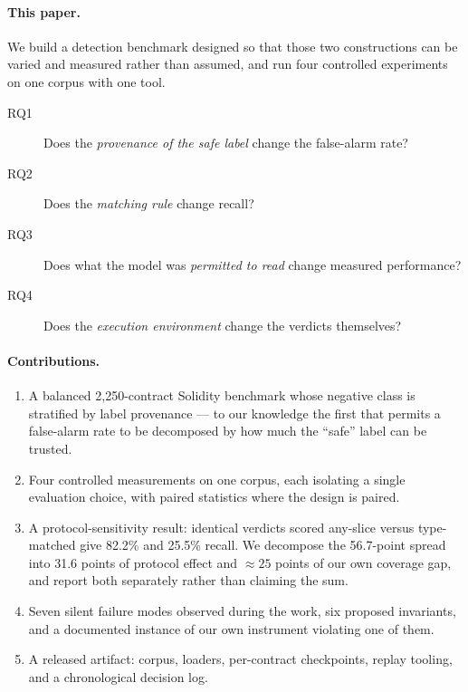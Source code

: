 \documentclass[sigconf,nonacm]{acmart}
\begin{document}
\paragraph{This paper.}
We build a detection benchmark designed so that those two constructions can be
varied and measured rather than assumed, and run four controlled experiments on
one corpus with one tool.

\begin{description}
\item[RQ1] Does the \emph{provenance of the safe label} change the false-alarm
  rate?
\item[RQ2] Does the \emph{matching rule} change recall?
\item[RQ3] Does what the model was \emph{permitted to read} change measured
  performance?
\item[RQ4] Does the \emph{execution environment} change the verdicts themselves?
\end{description}

\paragraph{Contributions.}
\begin{enumerate}
\item A balanced 2,250-contract Solidity benchmark whose negative class is
  stratified by label provenance --- to our knowledge the first that permits a
  false-alarm rate to be decomposed by how much the ``safe'' label can be
  trusted.
\item Four controlled measurements on one corpus, each isolating a single
  evaluation choice, with paired statistics where the design is paired.
\item A protocol-sensitivity result: identical verdicts scored any-slice versus
  type-matched give 82.2\% and 25.5\% recall. We decompose the 56.7-point spread
  into 31.6 points of protocol effect and ${\approx}25$ points of our own
  coverage gap, and report both separately rather than claiming the sum.
\item Seven silent failure modes observed during the work, six proposed
  invariants, and a documented instance of our own instrument violating one of
  them.
\item A released artifact: corpus, loaders, per-contract checkpoints, replay
  tooling, and a chronological decision log.
\end{enumerate}

\end{document}
